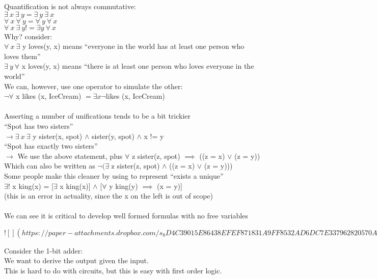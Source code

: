 \documentclass[../../lecture_notes.tex]{subfiles}
\begin{document}
\noindent Quantification is not always commutative:\\
	\indent $\exists \ x \ \exists \ y = \exists \ y \ \exists \ x$\\
	\indent $\forall \ x \ \forall \ y = \forall \ y \ \forall \ x$\\
	\indent $\forall \ x \ \exists \ y != \exists y \ \forall \ x$\\
Why? consider:\\
	\indent $\forall \ x \ \exists$ y loves(y, x) means “everyone in the world has at least one person who loves them”\\
	\indent $ \exists \ y \ \forall$ x loves(y, x) means “there is at least one person who loves everyone in the world”\\
We can, however, use one operator to simulate the other:\\
	\indent $\neg \forall$ x likes (x, IceCream) $= \exists x \neg$likes (x, IceCream)\\
\\
Asserting a number of unifications tends to be a bit trickier\\
	\indent “Spot has two sisters” \\
	\indent \indent $\rightarrow \exists \ x \ \exists$ y sister(x, spot) $\land$ sister(y, spot) $\land$ x != y\\
	\indent “Spot has exactly two sisters” \\
	\indent \indent $\rightarrow$ We use the above statement, 
		plus $\forall$ z sister(z, spot) $\implies$ ((z = x) $\lor$ (z = y))\\
        \indent Which can also be written as $\neg(\exists$ z sister(z, spot) $\land$ ((z = x) $\lor$ (z = y)))\\
Some people make this cleaner by using to represent “exists a unique”\\
\indent $\exists!$ x king(x) = [$\exists$ x king(x)] $\land$ [$\forall$ y king(y) $\implies$ (x = y)]\\
\indent \indent (this is an error in actuality, since the x on the left is out of scope)\\
\\
We can see it is critical to develop well formed formulas with no free variables

\newpage
$![](https://paper-attachments.dropbox.com/s_8D4C39015E86438EFEF871831A9FF8532AD6DC7E337962820570A542BB06D7AF_1589429882152_Untitled+drawing+20.jpg)$
\newpage

\noindent Consider the 1-bit adder:\\
\indent We want to derive the output given the input.\\
\indent This is hard to do with circuits, but this is easy with first order logic.\\
\end{document}
